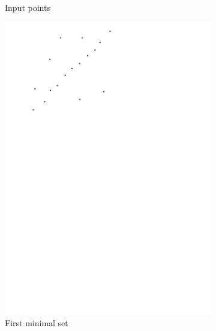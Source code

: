 \begin{figure}
\begin{subfigure}[b]{0.24\linewidth}
		\caption{Input points}\label{fig:ransac:a}
	\end{subfigure}
	\begin{subfigure}[b]{0.24\linewidth}
		\centering
		\includegraphics[width=\textwidth,page=2]{figs/ransac.pdf}
		\caption{First minimal set}\label{fig:ransac:b}
	\end{subfigure}
	\begin{subfigure}[b]{0.24\linewidth}
		\centering

\end{subfigure}
\end{figure}
